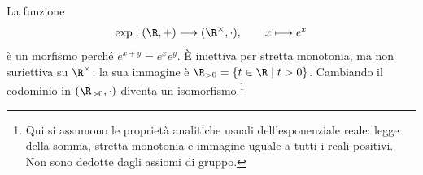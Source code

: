 \begin{esempio}[L'esponenziale]
La funzione
\[
\exp:(\R,+)\longrightarrow(\R^\times,\cdot),\qquad x\longmapsto e^x
\]
è un morfismo perché $e^{x+y}=e^xe^y$. È iniettiva per stretta monotonia, ma non suriettiva su $\R^\times$: la sua immagine è $\R_{>0}=\{t\in\R\mid t>0\}$. Cambiando il codominio in $(\R_{>0},\cdot)$ diventa un isomorfismo.\footnote{Qui si assumono le proprietà analitiche usuali dell'esponenziale reale: legge della somma, stretta monotonia e immagine uguale a tutti i reali positivi. Non sono dedotte dagli assiomi di gruppo.}
\end{esempio}
